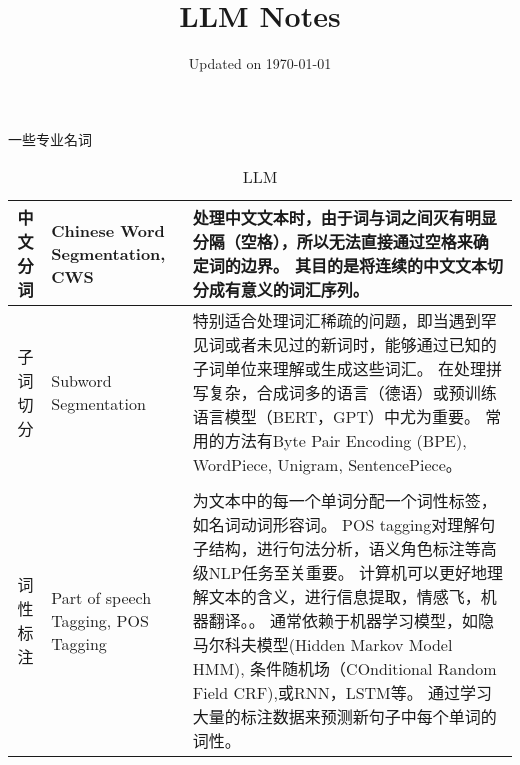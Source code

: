 \documentclass{article}
\title{LLM Notes}
\author{\mathfrak{Y} \mathfrak{R} }
\date{Updated on \today}
\begin{document}
\maketitle
一些专业名词
\begin{table}[h]
    \caption{LLM}
    \begin{tabular}{cp{5cm}p{9cm}}\toprule
    \hline
中文分词 & Chinese Word Segmentation, CWS & 处理中文文本时，由于词与词之间灭有明显分隔（空格），所以无法直接通过空格来确定词的边界。
                                            其目的是将连续的中文文本切分成有意义的词汇序列。 \\
\hline
子词切分 & Subword Segmentation           &   特别适合处理词汇稀疏的问题，即当遇到罕见词或者未见过的新词时，能够通过已知的子词单位来理解或生成这些词汇。
                                            在处理拼写复杂，合成词多的语言（德语）或预训练语言模型（BERT，GPT）中尤为重要。
                                            常用的方法有Byte Pair Encoding (BPE), WordPiece, Unigram, SentencePiece。\\                                                                 \\
\hline
词性标注 & Part of speech Tagging, POS Tagging & 为文本中的每一个单词分配一个词性标签，如名词动词形容词。 
                                                POS tagging对理解句子结构，进行句法分析，语义角色标注等高级NLP任务至关重要。
                                                计算机可以更好地理解文本的含义，进行信息提取，情感飞，机器翻译。。
                                                通常依赖于机器学习模型，如隐马尔科夫模型(Hidden Markov Model HMM), 条件随机场（COnditional Random Field CRF),或RNN，LSTM等。
                                                通过学习大量的标注数据来预测新句子中每个单词的词性。\\
\hline

     \hline                                                                
\end{tabular}
\end{table}

% 
\end{document}

